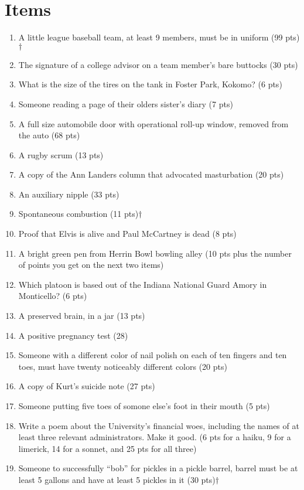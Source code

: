 \section{Items}
\begin{enumerate}
\item A little league baseball team, at least 9 members, must be in uniform (99 pts)$\dagger$
\item The signature of a college advisor on a team member's bare buttocks (30 pts)
\item What is the size of the tires on the tank in Foster Park, Kokomo? (6 pts)
\item Someone reading a page of their olders sister's diary (7 pts)
\item A full size automobile door with operational roll-up window, removed from the auto (68 pts)
\item A rugby scrum (13 pts)
\item A copy of the Ann Landers column that advocated masturbation (20 pts)
\item An auxiliary nipple (33 pts)
\item Spontaneous combustion (11 pts)$\dagger$
\item Proof that Elvis is alive and Paul McCartney is dead (8 pts)
\item A bright green pen from Herrin Bowl bowling alley (10 pts plus the number of points you get on the next two items)
\item Which platoon is based out of the Indiana National Guard Amory in Monticello? (6 pts)
\item A preserved brain, in a jar (13 pts)
\item A positive pregnancy test (28)
\item Someone with a different color of nail polish on each of ten fingers and ten toes, must have twenty noticeably different colors (20 pts)
\item A copy of Kurt's suicide note (27 pts)
\item Someone putting five toes of somone else's foot in their mouth (5 pts)
\item Write a poem about the University's financial woes, including the names of at least three relevant administrators. Make it good. (6 pts for a haiku, 9 for a limerick, 14 for a sonnet, and 25 pts for all three)
\item Someone to successfully ``bob'' for pickles in a pickle barrel, barrel must be at least 5 gallons and have at least 5 pickles in it (30 pts)$\dagger$

\end{enumerate}
